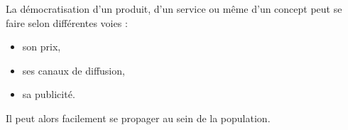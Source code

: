 \documentclass[a4paper,12pt]{report}
\begin{document}



%
%
%

La démocratisation d'un produit, d'un service ou même d'un concept peut se faire selon différentes voies :
\begin{itemize}
	\item son prix,
	\item ses canaux de diffusion,
	\item sa publicité.
\end{itemize}
Il peut alors facilement se propager au sein de la population.
\end{document}
